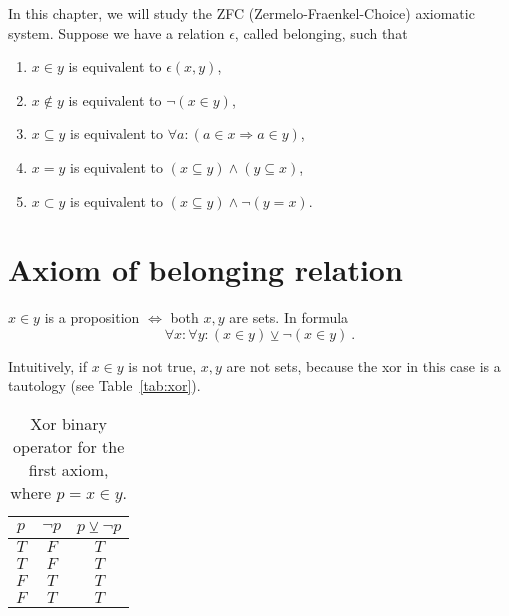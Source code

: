     In this chapter, we will study the ZFC (Zermelo-Fraenkel-Choice) axiomatic system. Suppose we have a relation $\epsilon$, called belonging, such that
    \begin{enumerate}
        \item $x \in y$ is equivalent to $\epsilon (x, y)$,
        \item $x \notin y$ is equivalent to $\lnot (x \in y)$,
        \item $x \subseteq y$ is equivalent to $\forall a \colon (a \in x \Rightarrow a \in y)$,
        \item $x = y$ is equivalent to $(x \subseteq y) \land (y \subseteq x)$,
        \item $x \subset y$ is equivalent to $(x \subseteq y) \land \lnot(y = x)$.
    \end{enumerate}

\section{Axiom of belonging relation}

    \begin{axiom}
        $x \in y$ is a proposition $\Leftrightarrow$ both $x, y$ are sets. In formula 
        \begin{equation*}
            \forall x \colon \forall y \colon (x \in y) \veebar \lnot (x \in y) ~.
        \end{equation*}
    \end{axiom}
    \noindent Intuitively, if $x \in y$ is not true, $x, y$ are not sets, because the xor in this case is a tautology (see Table~\eqref{tab:xor}).
    \begin{table}[h!]
        \centering
        \begin{tabular}{c | c || c }
            $p$ & $\lnot p$ & $p \veebar \lnot p$ \\
            \hline
            \hline
            $T$ & $F$ & $T$ \\
            $T$ & $F$ & $T$ \\
            $F$ & $T$ & $T$ \\
            $F$ & $T$ & $T$ \\
        \end{tabular}
        \caption{Xor binary operator for the first axiom, where $p = x \in y$. }
        \label{tab:xor}
    \end{table}


